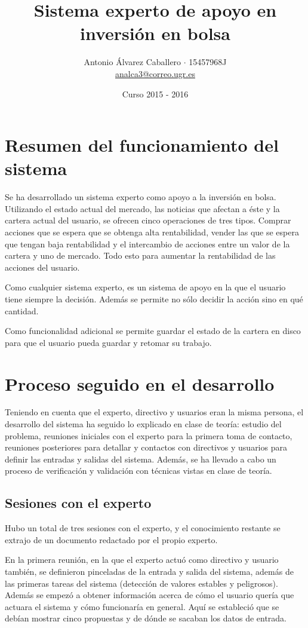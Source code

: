 \documentclass[a4paper, 11pt, titlepage]{article}
\title{Sistema experto de apoyo en inversión en bolsa}
\author{Antonio Álvarez Caballero $\cdot$ 15457968J\\
    \href{mailto:analca3@correo.ugr.es}{analca3@correo.ugr.es}}
\date{Curso 2015 - 2016}
\theoremstyle{definition}
\begin{document}
  \maketitle
  \tableofcontents
  \newpage

  \section{Resumen del funcionamiento del sistema}

  Se ha desarrollado un sistema experto como apoyo a la inversión en bolsa.
  Utilizando el estado actual del mercado, las noticias que afectan a éste y la
  cartera actual del usuario, se ofrecen cinco operaciones de tres tipos.
  Comprar acciones que se espera que se obtenga alta rentabilidad, vender las
  que se espera que tengan baja rentabilidad y el intercambio de acciones
  entre un valor de la cartera y uno de mercado. Todo esto para aumentar la
  rentabilidad de las acciones del usuario.

  Como cualquier sistema experto, es un sistema de apoyo en la que el usuario
  tiene siempre la decisión. Además se permite no sólo decidir la acción sino
  en qué cantidad.

  Como funcionalidad adicional se permite guardar el estado de la cartera en
  disco para que el usuario pueda guardar y retomar su trabajo.

  \section{Proceso seguido en el desarrollo}
  Teniendo en cuenta que el experto, directivo y usuarios eran la misma persona,
  el desarrollo del sistema ha seguido lo explicado en clase de teoría: estudio
  del problema, reuniones iniciales con el experto para la primera toma de
  contacto, reuniones posteriores para detallar y contactos con directivos
  y usuarios para definir las entradas y salidas del sistema. Además, se ha
  llevado a cabo un proceso de verificación y validación con técnicas vistas
  en clase de teoría.

  \subsection{Sesiones con el experto}
  Hubo un total de tres sesiones con el experto, y el conocimiento restante se
  extrajo de un documento redactado por el propio experto.

  En la primera reunión, en la que el experto actuó como directivo y usuario
  también, se definieron pinceladas de la entrada y salida del sistema, además
  de las primeras tareas del sistema (detección de valores estables y peligrosos).
  Además se empezó a obtener información acerca de cómo el usuario quería que
  actuara el sistema y cómo funcionaría en general. Aquí se estableció que
  se debían mostrar cinco propuestas y de dónde se sacaban los datos de entrada.
\end{document}
